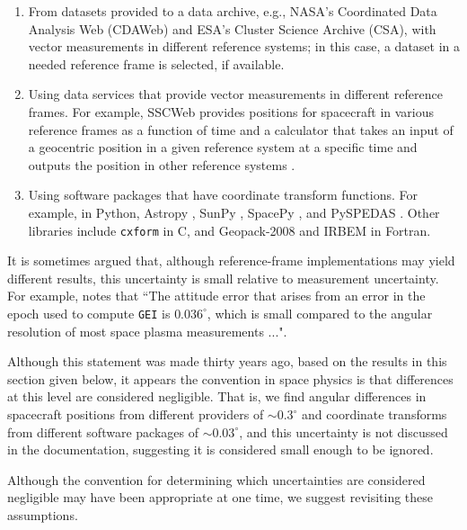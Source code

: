 \documentclass[draft]{agujournal2019}
\begin{document}
\begin{enumerate}

    \parskip 0.1in

    \item From datasets provided to a data archive, e.g., NASA's Coordinated Data Analysis Web (CDAWeb) and ESA's Cluster Science Archive (CSA), with vector measurements in different reference systems; in this case, a dataset in a needed reference frame is selected, if available.

    \item Using data services that provide vector measurements in different reference frames. For example, SSCWeb provides positions for spacecraft in various reference frames as a function of time \cite{SSCWeb} and a calculator that takes an input of a geocentric position in a given reference system at a specific time and outputs the position in other reference systems \cite{SSCWebCoordinateCalculator}.

    \item Using software packages that have coordinate transform functions. For example, in Python, Astropy \cite{AstroPy2022}, SunPy \cite{SunPy}, SpacePy \cite{SpacePy}, and PySPEDAS \cite{PySPEDAS}. Other libraries include \texttt{cxform} \cite{cxform} in C, and Geopack-2008 \cite{Tsyganenko2008} and IRBEM \cite{IRBEM2022} in Fortran.

\end{enumerate}

It is sometimes argued that, although reference-frame implementations may yield different results, this uncertainty is small relative to measurement uncertainty. For example,  notes that ``The attitude error that arises from an error in the epoch used to compute \texttt{GEI} is $0.036^\circ$, which is small compared to the angular resolution of most space plasma measurements ...". 

Although this statement was made thirty years ago, based on the results in this section given below, it appears the convention in space physics is that differences at this level are considered negligible. That is, we find angular differences in spacecraft positions from different providers of ${\sim}0.3^\circ$ and coordinate transforms from different software packages of ${\sim} 0.03^\circ$, and this uncertainty is not discussed in the documentation, suggesting it is considered small enough to be ignored.

Although the convention for determining which uncertainties are considered negligible may have been appropriate at one time, we suggest revisiting these assumptions.
\end{document}
